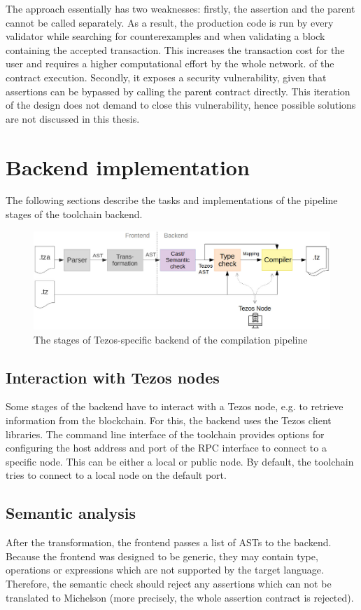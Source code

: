 The approach essentially has two weaknesses: firstly, the assertion and the parent cannot be called separately. As a result, the production code is run by every validator while searching for counterexamples and when validating a block containing the accepted transaction. This increases the transaction cost for the user and requires a higher computational effort by the whole network. of the contract execution. Secondly, it exposes a security vulnerability, given that assertions can be bypassed by calling the parent contract directly. This iteration of the design does not demand to close this vulnerability, hence possible solutions are not discussed in this thesis. 

\section{Backend implementation}\label{sec:backend_impl}
The following sections describe the tasks and implementations of the pipeline stages of the toolchain backend.
\begin{figure}[h]
\includegraphics[width=\linewidth]{figures/5-offline_tezos/pipeline_backend}
\caption{The stages of Tezos-specific backend of the compilation pipeline}
\label{fig:pipeline_backend}
\end{figure}

\subsection{Interaction with Tezos nodes}
Some stages of the backend have to interact with a Tezos node, e.g. to retrieve information from the blockchain. For this, the backend uses the Tezos client libraries. The command line interface of the toolchain provides options for configuring the host address and port of the RPC interface to connect to a specific node. This can be either a local or public node. By default, the toolchain tries to connect to a local node on the default port.

\subsection{Semantic analysis}
After the transformation, the frontend passes a list of ASTs to the backend. Because the frontend was designed to be generic, they may contain type, operations or expressions which are not supported by the target language. Therefore, the semantic check should reject any assertions which can not be translated to Michelson (more precisely, the whole assertion contract is rejected).

